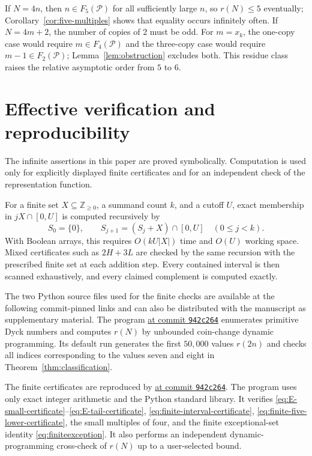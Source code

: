 \documentclass{ws-ijfcs}
\newcommand{\Pset}{\mathcal P}
\begin{document}
\begin{remark}
If $N=4n$, then $n\in F_5(\Pset)$ for all sufficiently large $n$, so
$r(N)\leq5$ eventually; Corollary~\ref{cor:five-multiples} shows that
equality occurs infinitely often.  If $N=4m+2$, the number of copies of
$2$ must be odd.  For $m=x_k$, the one-copy case would require
$m\in F_4(\Pset)$ and the three-copy case would require
$m-1\in F_2(\Pset)$; Lemma~\ref{lem:obstruction} excludes both.  This
residue class raises the relative asymptotic order from $5$ to $6$.
\end{remark}

\section{Effective verification and reproducibility}\label{sec:verification}

The infinite assertions in this paper are proved symbolically.  Computation
is used only for explicitly displayed finite certificates and for an
independent check of the representation function.

For a finite set $X\subseteq\mathbb Z_{\geq0}$, a summand count $k$, and
a cutoff $U$, exact membership in $jX\cap[0,U]$ is computed recursively by
\[
 S_0=\{0\},\qquad
 S_{j+1}=(S_j+X)\cap[0,U]
 \quad(0\leq j<k).
\]
With Boolean arrays, this requires $O(kU|X|)$ time and $O(U)$ working
space.  Mixed certificates such as $2H+3L$ are checked by the same
recursion with the prescribed finite set at each addition step.  Every
contained interval is then scanned exhaustively, and every claimed
complement is computed exactly.

The two Python source files used for the finite checks are available at the
following commit-pinned links and can also be distributed with the
manuscript as supplementary material.  The program
\href{https://github.com/growupkuriyama-hub/lean_cfg_project/blob/942c264/LeanCfgProject/PrimDyck/primitive_dyck_representation.py}
{ at commit \texttt{942c264}}
enumerates primitive Dyck numbers and computes $r(N)$ by unbounded
coin-change dynamic programming.  Its default run generates the first
$50{,}000$ values $r(2n)$ and checks all indices corresponding to the
values seven and eight in Theorem~\ref{thm:classification}.

The finite certificates are reproduced by
\href{https://github.com/growupkuriyama-hub/lean_cfg_project/blob/942c264/LeanCfgProject/PrimDyck/verify_certificates_for_paper.py}
{ at commit \texttt{942c264}}.
The program uses only exact integer arithmetic and the Python standard
library.  It verifies
\eqref{eq:E-small-certificate}--\eqref{eq:E-tail-certificate},
\eqref{eq:finite-interval-certificate},
\eqref{eq:finite-five-lower-certificate}, the small multiples of four,
and the finite exceptional-set identity \eqref{eq:finiteexception}.  It
also performs an independent dynamic-programming cross-check of $r(N)$ up
to a user-selected bound.
\end{document}
